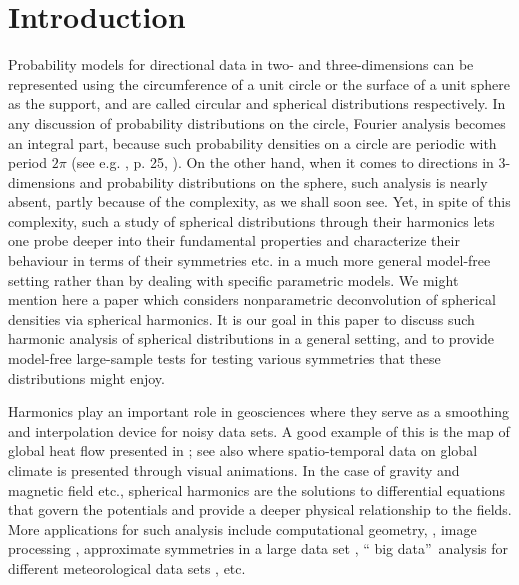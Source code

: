 \documentclass[preprint,11pt,a4paper]{elsarticle}
\begin{document}


\section{Introduction}

Probability models for directional data in two- and three-dimensions can be
represented using the circumference of a unit circle or the surface of a
unit sphere as the support, and are called circular and spherical
distributions respectively. In any discussion of probability distributions
on the circle, Fourier analysis becomes an integral part, because such
probability densities on a circle are periodic with period $2\pi$ (see e.g. 
\cite{jammalamadaka2001topics}, p. 25, \cite{mardia2009directional}). On the
other hand, when it comes to directions in 3-dimensions and probability
distributions on the sphere, such analysis is nearly absent, partly because
of the complexity, as we shall soon see. Yet, in spite of this complexity,
such a study of spherical distributions through their harmonics lets one
probe deeper into their fundamental properties and characterize their
behaviour in terms of their symmetries etc. in a much more general
model-free setting rather than by dealing with specific parametric models.
We might mention here a paper \cite{healy1998spherical} which considers
nonparametric deconvolution of spherical densities via spherical harmonics.
It is our goal in this paper to discuss such harmonic analysis of spherical
distributions in a general setting, and to provide model-free large-sample
tests for testing various symmetries that these distributions might enjoy.

Harmonics play an important role in geosciences where they serve as a
smoothing and interpolation device for noisy data sets. A good example of
this is the map of global heat flow presented in \cite{CHAPMAN1975}; see
also \cite{GentonSTA477} where spatio-temporal data on global climate is
presented through visual animations. In the case of gravity and magnetic
field etc., spherical harmonics are the solutions to differential equations
that govern the potentials and provide a deeper physical relationship to the
fields. More applications for such analysis include computational geometry, 
\cite{kazhdan2004reflective}, image processing \cite{sun19973d}, approximate
symmetries in a large data set \cite{korman2015probably}, \textquotedblleft
big data\textquotedblright\ analysis for different meteorological data sets 
\cite{de2015tracing}, etc.
\end{document}
